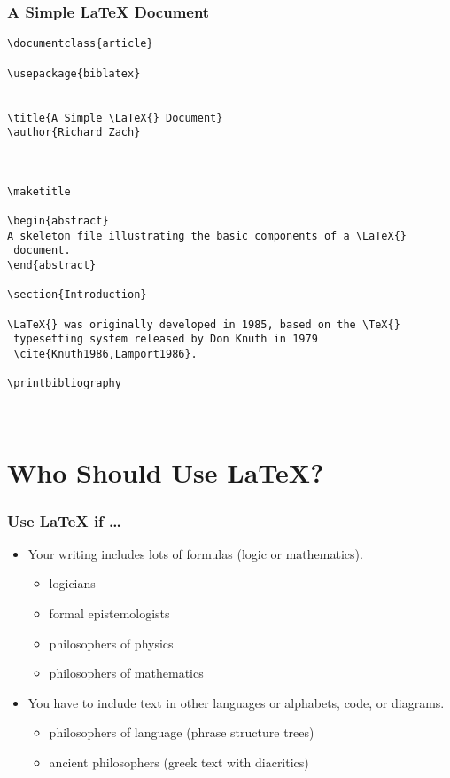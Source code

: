 \begin{frame}
\frametitle{A Simple \LaTeX{} Document}

\begin{verbatim}
\documentclass{article}

\usepackage{biblatex}


\title{A Simple \LaTeX{} Document}
\author{Richard Zach}



\maketitle

\begin{abstract}
A skeleton file illustrating the basic components of a \LaTeX{}
 document.
\end{abstract}

\section{Introduction}

\LaTeX{} was originally developed in 1985, based on the \TeX{}
 typesetting system released by Don Knuth in 1979
 \cite{Knuth1986,Lamport1986}.

\printbibliography



\end{verbatim}



\section*{Who Should Use \LaTeX{}?}

\begin{frame}
\frametitle{Use \LaTeX{} if \dots }

\begin{itemize}
\item Your writing includes lots of formulas (logic or mathematics). 
  \begin{itemize}
  \item logicians 
  \item formal epistemologists
  \item philosophers of physics
  \item philosophers of mathematics
  \end{itemize}

\item You have to include text in other languages or alphabets, code,
or diagrams.
\begin{itemize}
\item philosophers of language (phrase structure trees)
\item ancient philosophers (greek text with diacritics)
\end{itemize}


\end{itemize}
\end{frame}
\end{frame}
